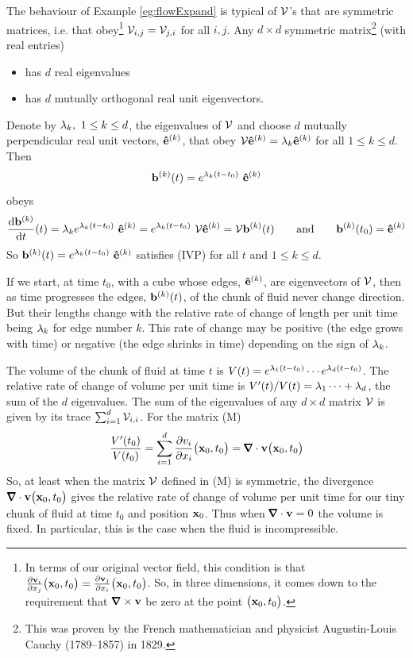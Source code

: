 \begin{eg}\label{eg:flowExpandB}
The behaviour of Example \ref{eg:flowExpand} is typical of $\mathcal{V}$'s 
that are symmetric matrices,
i.e. that obey\footnote{In terms of our original vector field, this condition
is that 
$\frac{\partial \mathbf{v}_i}{\partial x_j}\big(\mathbf{x}_0,t_0\big)
=\frac{\partial \mathbf{v}_j}{\partial x_i}\big(\mathbf{x}_0,t_0\big)$.
So, in three dimensions, it comes down to the requirement that 
$\vnabla\times\vv$ be zero at the point $\big(\mathbf{x}_0,t_0\big)$.}
 $\mathcal{V}_{i,j}=\mathcal{V}_{j,i}$ for all $i,j$. 
Any $d\times d$ symmetric matrix\footnote{This was proven by the French mathematician and physicist Augustin-Louis Cauchy (1789--1857) in 1829.} 
(with real entries)
\begin{itemize}\itemsep1pt \parskip0pt  %
\item[$\circ$]
 has $d$ real eigenvalues
\item[$\circ$] 
has $d$ mutually orthogonal real unit eigenvectors.
\end{itemize}
Denote by $\lambda_k,\ 1\le k\le d$, the eigenvalues of $\mathcal{V}$ and choose
$d$ mutually perpendicular real unit vectors, $\mathbf{\hat e}^{(k)}$,  that obey 
$\mathcal{V}\mathbf{\hat e}^{(k)}=\lambda_k\mathbf{\hat e}^{(k)}$ for all $1\le k\le d$. Then
\begin{equation*}
\vb^{(k)}(t)=e^{\la_k (t-t_0)}\ \ha{k}
\end{equation*}
obeys
\begin{equation*}
\diff{\vb^{(k)}}{t}(t)=\la_ke^{\la_k (t-t_0)}\ \ha{k}=e^{\la_k (t-t_0)}\ \cV\ha{k}
=\cV\vb^{(k)}(t)\qquad\text{and}\qquad
\vb^{(k)}(t_0)= \ha{k}
\end{equation*}
So $\mathbf{b}^{(k)}(t)=e^{\lambda_k (t-t_0)}\ \mathbf{\hat e}^{(k)}$ satisfies (IVP) for all $t$ and 
$1\le k\le d$. 

If we start, at time $t_0$, with a cube whose edges, $\mathbf{\hat e}^{(k)}$,
 are eigenvectors of $\mathcal{V}$, then as time progresses the edges, 
$\mathbf{b}^{(k)}(t)$, of the chunk of fluid never change direction. But their lengths 
change with the relative rate of change of length per unit time being $\lambda_k$
for edge number $k$. This rate of change may be positive (the edge grows
with time) or negative (the edge shrinks in time) depending on the sign
of $\lambda_k$. 

The volume of the chunk of fluid at time $t$ is 
$V(t)=e^{\lambda_1 (t-t_0)}\cdots e^{\lambda_d (t-t_0)}$. The relative rate of change
of volume per unit time is $V'(t)/V(t)=\lambda_1\cdots+\lambda_d$, the sum of the
$d$ eigenvalues.  The sum of the eigenvalues of any $d\times d$ matrix $\mathcal{V}$ 
is given by its trace $\sum_{i=1}^d \mathcal{V}_{i,i}$. For the matrix (M)
\begin{equation*}
\frac{V'(t_0)}{V(t_0)}
=\sum_{i=1}^d \frac{\partial v_i}{\partial x_i}\big(\vx_0,t_0\big)
=\vnabla\cdot\vv\big(\vx_0,t_0\big)
\end{equation*}
So, at least when the matrix $\mathcal{V}$ defined in (M) is symmetric, the 
divergence $\vnabla\cdot\vv\big(\vx_0,t_0\big)$ gives the relative 
rate of change of volume per unit time for our tiny chunk of fluid at 
time $t_0$ and position $\mathbf{x}_0$. Thus when $\vnabla\cdot\vv=0$ the volume is
fixed. In particular, this is the case when the fluid is incompressible. 
\end{eg}
